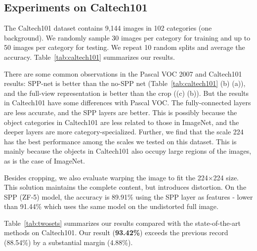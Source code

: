 \documentclass[10pt,journal,cspaper,compsoc]{IEEEtran}
\begin{document}
\subsection{Experiments on Caltech101}

The Caltech101 dataset \cite{Fei-Fei2007} contains 9,144 images in 102 categories (one background). We randomly sample 30 images per category for training and up to 50 images per category for testing. We repeat 10 random splits and average the accuracy. Table~\ref{tab:caltech101} summarizes our results.

There are some common observations in the Pascal VOC 2007 and Caltech101 results: SPP-net is better than the no-SPP net (Table~\ref{tab:caltech101} (b) \vs (a)), and the full-view representation is better than the crop ((c) \vs (b)). But the results in Caltech101 have some differences with Pascal VOC. The fully-connected layers are less accurate, and the SPP layers are better. This is possibly because the object categories in Caltech101 are less related to those in ImageNet, and the deeper layers are more category-specialized.
Further, we find that the scale 224 has the best performance among the scales we tested on this dataset. This is mainly because the objects in Caltech101 also occupy large regions of the images, as is the case of ImageNet.

Besides cropping, we also evaluate warping the image to fit the 224$\times$224 size. This solution maintains the complete content, but introduces distortion. On the SPP (ZF-5) model, the accuracy is 89.91\% using the SPP layer as features - lower than 91.44\% which uses the same model on the undistorted full image.

Table~\ref{tab:twosets} summarizes our results compared with the state-of-the-art methods on Caltech101. Our result (\textbf{93.42\%}) exceeds the previous record (88.54\%) by a substantial margin (4.88\%).
\end{document}
